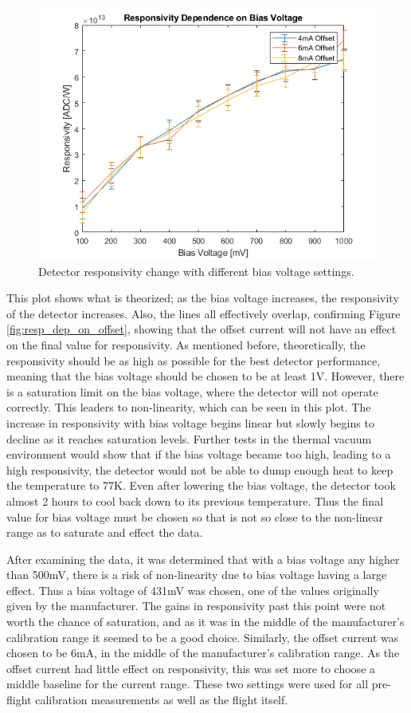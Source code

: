 \begin{figure}[h]
  \includegraphics[width=\linewidth]{chap6_images/verification/resp_dependence_on_bias.png}
  \caption{Detector responsivity change with different bias voltage settings.}
  \label{fig:resp_dep_on_bias}
\end{figure}

This plot shows what is theorized; as the bias voltage increases, the responsivity of the detector increases. Also, the lines all effectively overlap, confirming Figure \ref{fig:resp_dep_on_offset}, showing that the offset current will not have an effect on the final value for responsivity. As mentioned before, theoretically, the responsivity should be as high as possible for the best detector performance, meaning that the bias voltage should be chosen to be at least 1V. However, there is a saturation limit on the bias voltage, where the detector will not operate correctly. This leaders to non-linearity, which can be seen in this plot. The increase in responsivity with bias voltage begins linear but slowly begins to decline as it reaches saturation levels. Further tests in the thermal vacuum environment would show that if the bias voltage became too high, leading to a high responsivity, the detector would not be able to dump enough heat to keep the temperature to 77K. Even after lowering the bias voltage, the detector took almost 2 hours to cool back down to its previous temperature. Thus the final value for bias voltage must be chosen so that is not so close to the non-linear range as to saturate and effect the data.

After examining the data, it was determined that with a bias voltage any higher than 500mV, there is a risk of non-linearity due to bias voltage having a large effect. Thus a bias voltage of 431mV was chosen, one of the values originally given by the manufacturer. The gains in responsivity past this point were not worth the chance of saturation, and as it was in the middle of the manufacturer's calibration range it seemed to be a good choice. Similarly, the offset current was chosen to be 6mA, in the middle of the manufacturer's calibration range. As the offset current had little effect on responsivity, this was set more to choose a middle baseline for the current range. These two settings were used for all pre-flight calibration measurements as well as the flight itself.

